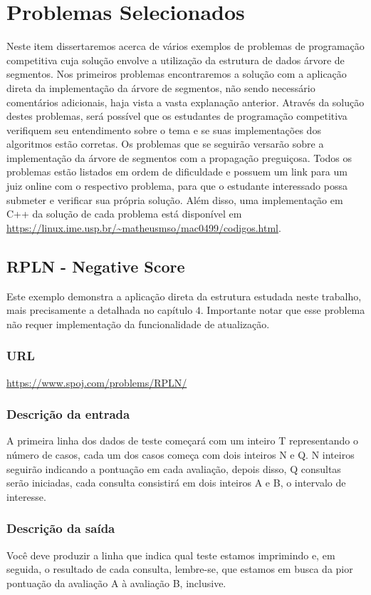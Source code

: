 \chapter{Problemas Selecionados}
\label{cap:maratona}

Neste item dissertaremos acerca de vários exemplos de problemas de programação competitiva
cuja solução envolve a utilização da estrutura de dados árvore de segmentos. 
Nos primeiros problemas encontraremos a solução com a
aplicação direta da implementação da árvore de segmentos, não sendo necessário comentários adicionais, haja vista a vasta explanação anterior.
Através da solução destes problemas, será possível que os estudantes de programação competitiva verifiquem seu entendimento sobre o tema
e se suas implementações dos algoritmos estão corretas. Os  problemas que se seguirão versarão sobre a implementação da árvore de segmentos com a propagação preguiçosa.
Todos os problemas
estão listados em ordem de dificuldade e possuem um link para um juiz online com o respectivo problema,
para que o estudante interessado possa submeter e verificar sua própria solução. Além disso, uma implementação
em C++ da solução de cada problema está disponível em \url{https://linux.ime.usp.br/~matheusmso/mac0499/codigos.html}.

\section{RPLN - Negative Score}
Este exemplo demonstra a aplicação direta da estrutura estudada neste trabalho, mais precisamente a detalhada no capítulo $4$. Importante notar que esse problema não requer implementação da funcionalidade de atualização.
\subsection{URL}
\url{https://www.spoj.com/problems/RPLN/}
\subsection{Descrição da entrada}
A primeira linha dos dados de teste começará com um inteiro T representando o número de  casos, cada um dos casos começa com dois inteiros N e Q. N inteiros seguirão indicando a pontuação em cada avaliação, depois disso, Q consultas serão iniciadas, cada consulta consistirá em dois inteiros A e B, o intervalo de interesse.
\subsection{Descrição da saída}
Você deve produzir a linha que indica qual teste estamos imprimindo e, em seguida, o resultado de cada consulta, lembre-se, que estamos em busca da pior pontuação da avaliação A à avaliação B, inclusive.

